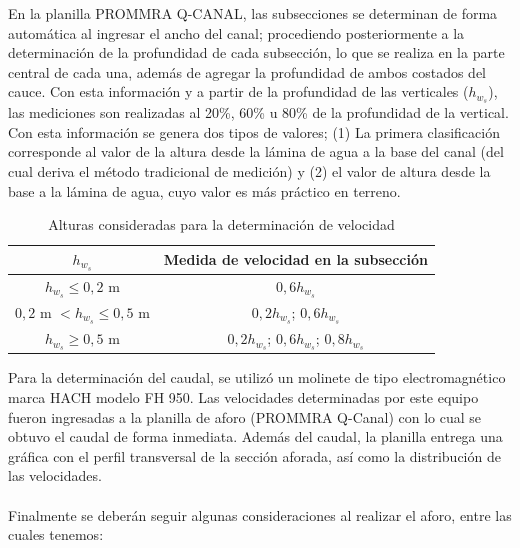 \documentclass[]{article}
\begin{document}
En la planilla PROMMRA Q-CANAL, las subsecciones se determinan de forma automática al ingresar el ancho del canal; procediendo posteriormente a la determinación de la profundidad de cada subsección, lo que se realiza en la parte central de cada una, además de agregar la profundidad de ambos costados del cauce. Con esta información y a partir de la profundidad de las verticales (\(h_{w_s}\)), las mediciones son realizadas al 20\%, 60\% u 80\% de la profundidad de la vertical. Con esta información se genera dos tipos de valores; (1) La primera clasificación corresponde al valor de la altura desde la lámina de agua a la base del canal (del cual deriva el método tradicional de medición) y (2) el valor de altura desde la base a la lámina de agua, cuyo valor es más práctico en terreno.

\begin{table}[H]
 \caption{Alturas consideradas para la determinación de velocidad}
 \centering
 \begin{tabu} {cc}
 \toprule
 $h_{w_s}$ & Medida de velocidad en la subsección\\
 \midrule 
    $h_{w_s} \leq 0,2$ m & $0,6h_{w_s}$ \\ 
    $0,2$ m $< h_{w_s} \leq 0,5$ m  & $0,2h_{w_s}$; $0,6h_{w_s}$\\ 
    $h_{w_s} \geq 0,5$ m & $0,2h_{w_s}$; $0,6h_{w_s}$; $0,8h_{w_s}$\\
    \hline 
 \end{tabu}
\end{table}

Para la determinación del caudal, se utilizó un molinete de tipo electromagnético marca HACH modelo FH 950. Las velocidades determinadas por este equipo fueron ingresadas a la planilla de aforo (PROMMRA Q-Canal) con lo cual se obtuvo el caudal de forma inmediata. Además del caudal, la planilla entrega una gráfica con el perfil transversal de la sección aforada, así como la distribución de las velocidades.\\
\\
Finalmente se deberán seguir algunas consideraciones al realizar el aforo, entre las cuales tenemos:
\end{document}
